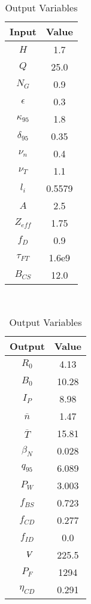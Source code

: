 \begin{table}[h!]
\centering  
\caption{Charybdis Variables}
\hfill
\begin{subtable}[t]{0.4\textwidth}
\centering  
\caption{Input Variables} ~\\
\begin{tabular}{ c|c } 

Input            & Value           \\
\hline
$H$              & 1.7              \\
$Q$              & 25.0             \\
$N_{G}$          & 0.9              \\
$\epsilon$       & 0.3              \\
$\kappa_{95}$    & 1.8              \\
$\delta_{95}$    & 0.35             \\
$\nu_{n}$        & 0.4              \\
$\nu_{T}$        & 1.1              \\
$l_{i}$          & 0.5579         \\
$A$              & 2.5              \\
$Z_{eff}$        & 1.75             \\
$f_{D}$          & 0.9              \\
$\tau_{FT}$      & 1.6e9            \\
$B_{CS}$         & 12.0             \\

\end{tabular}
\end{subtable}
\hfill
\begin{subtable}[t]{0.5\textwidth}
\centering  
\caption{Output Variables} ~\\
\begin{tabular}{ c|c } 

Output           & Value       \\
\hline
$R_{0}$          & 4.13            \\
$B_{0}$          & 10.28            \\
$I_{P}$          & 8.98            \\
$\overline n$    & 1.47            \\
$\overline T$    & 15.81           \\
$\beta_{N}$       & 0.028            \\
$q_{95}$         & 6.089            \\
$P_{W}$          & 3.003            \\
$f_{BS}$         & 0.723           \\
$f_{CD}$         & 0.277           \\
$f_{ID}$         & 0.0              \\
$\volume$         & 225.5            \\
$P_{F}$          & 1294           \\
$\eta_{CD}$      & 0.291           \\


\end{tabular}
\end{subtable}
\end{table}
